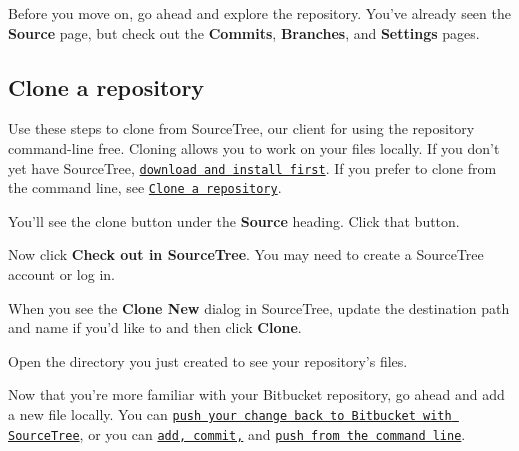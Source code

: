 Before you move on, go ahead and explore the repository. You've already seen the {\bfseries Source} page, but check out the {\bfseries Commits}, {\bfseries Branches}, and {\bfseries Settings} pages. 



\subsection*{Clone a repository}

Use these steps to clone from Source\+Tree, our client for using the repository command-\/line free. Cloning allows you to work on your files locally. If you don't yet have Source\+Tree, \href{https://www.sourcetreeapp.com/}{\tt download and install first}. If you prefer to clone from the command line, see \href{https://confluence.atlassian.com/x/4whODQ}{\tt Clone a repository}.


\begin{DoxyEnumerate}
\item You’ll see the clone button under the {\bfseries Source} heading. Click that button.
\item Now click {\bfseries Check out in Source\+Tree}. You may need to create a Source\+Tree account or log in.
\item When you see the {\bfseries Clone New} dialog in Source\+Tree, update the destination path and name if you’d like to and then click {\bfseries Clone}.
\item Open the directory you just created to see your repository’s files.
\end{DoxyEnumerate}

Now that you're more familiar with your Bitbucket repository, go ahead and add a new file locally. You can \href{https://confluence.atlassian.com/x/iqyBMg}{\tt push your change back to Bitbucket with Source\+Tree}, or you can \href{https://confluence.atlassian.com/x/8QhODQ}{\tt add, commit,} and \href{https://confluence.atlassian.com/x/NQ0zDQ}{\tt push from the command line}. 